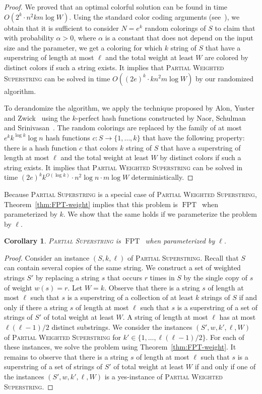 \documentclass[11pt]{article}
\newtheorem{corollary}{Corollary}
\DeclareMathOperator{\operatorClassFPT}{FPT}
\newcommand{\classFPT}{\ensuremath{\operatorClassFPT}}
\begin{document}
\begin{proof}
We proved that an optimal colorful solution can be found in time  $O(2^k\cdot n^2 k m\log W)$. Using the standard color coding arguments (see~\cite{AlonYZ95}), we obtain that it is sufficient to consider $N=e^k$ random colorings of $S$ to claim that with probability $\alpha>0$, where $\alpha$ is a constant that does not depend on the input size and the parameter, we get a coloring for which $k$ string of $S$ that have a superstring of length at most $\ell$ and the total weight at least $W$ are colored by distinct colors if such a string exists.  It implies that 
\textsc{Partial Weighted Superstring} can be solved  
in time $O((2e)^{k}\cdot k n^2 m\log W)$ by  our randomized algorithm.

To derandomize the algorithm, we apply the  technique proposed by Alon, Yuster and Zwick~\cite{AlonYZ95}
using the $k$-perfect hash functions constructed by Naor, Schulman and Srinivasan~\cite{NaorSS95}. 
The random colorings are replaced by the family of at most $e^{k}k^{\log k}\log n$ hash functions $c\colon S\rightarrow\{1,\ldots,k\}$ that have the following property:
there is a hash function $c$ that colors 
$k$ string of $S$ that have a superstring of length at most $\ell$ and the total weight at least $W$ by distinct colors if such a string exists.
It implies that \textsc{Partial Weighted Superstring} can be solved in time $(2e)^k k^{O(\log k)}\cdot n^2\log n\cdot m\log W$ deterministically.
\end{proof}

Because \textsc{Partial Superstring} is a special case of \textsc{Partial Weighted Superstring}, Theorem~\ref{thm:FPT-weight} implies that this problem is \classFPT\ when parameterized by $k$. We show that the same holds if we parameterize the problem by $\ell$.

\begin{corollary}\label{cor:FPT-ell}
\textsc{Partial Superstring} is \classFPT\ when parameterized by $\ell$.
\end{corollary}

\begin{proof}
Consider an instance $(S,k,\ell)$ of \textsc{Partial Superstring}.  Recall that $S$ can contain several copies of the same string. We construct a set of weighted strings $S'$ by replacing a string $s$ that occurs $r$ times in $S$ by the single copy of $s$ of weight $w(s)=r$. Let $W=k$.
Observe that there is a string $s$ of length at most $\ell$ such that $s$ is a superstring of a collection of at least $k$ strings of $S$ if and only if there a string $s$ of length at most $\ell$ such that $s$ is a superstring of a set of  strings of $S'$ of total weight at least $W$.  A string of length at most $\ell$ has at most $\ell(\ell-1)/2$ distinct substrings. We consider the instances 
$(S',w,k',\ell,W)$ of \textsc{Partial Weighted Superstring} for $k'\in\{1,\ldots,\ell(\ell-1)/2\}$. For each of these instances, we solve the problem using Theorem~\ref{thm:FPT-weight}.
It remains to observe that  there is a string $s$ of length at most $\ell$ such that $s$ is a superstring of a set of  strings of $S'$ of total weight at least $W$ if and only if one of the instances 
$(S',w,k',\ell,W)$ is a yes-instance of \textsc{Partial Weighted Superstring}.
\end{proof}
\end{document}
